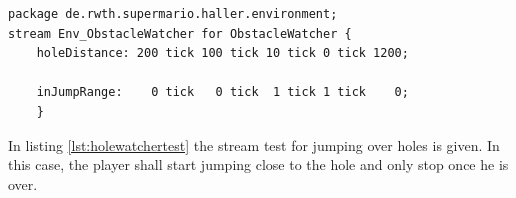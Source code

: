 \begin{lstlisting}[label=lst:holewatchertest, caption=Hole watcher stream test, morekeywords={package, stream, tick, for},
frame=single, basicstyle=\small, float,floatplacement=H]
package de.rwth.supermario.haller.environment;
stream Env_ObstacleWatcher for ObstacleWatcher {
    holeDistance: 200 tick 100 tick 10 tick 0 tick 1200;
    
    inJumpRange:    0 tick   0 tick  1 tick	1 tick    0;
    }
\end{lstlisting}

In listing \ref{lst:holewatchertest} the stream test for jumping over holes is given. In this case, the player shall start jumping close to the hole and only stop once he is over.


